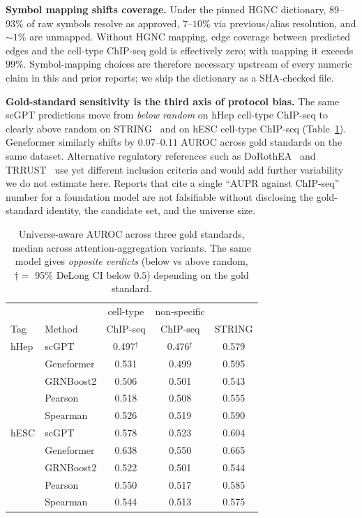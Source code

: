 \documentclass[sigconf, nonacm, anonymous]{acmart}
\begin{document}
\textbf{Symbol mapping shifts coverage.}
Under the pinned HGNC dictionary, $89$--$93\%$ of raw symbols resolve
as approved, $7$--$10\%$ via previous/alias resolution, and $\sim 1\%$
are unmapped. Without HGNC mapping, edge coverage between
predicted edges and the cell-type ChIP-seq gold is effectively zero;
with mapping it exceeds $99\%$. Symbol-mapping choices are therefore
necessary upstream of every numeric claim in this and prior reports;
we ship the dictionary as a SHA-checked file.

\textbf{Gold-standard sensitivity is the third axis of protocol bias.}
The same scGPT predictions move from \emph{below random} on hHep
cell-type ChIP-seq to clearly above random on STRING~\cite{string2019}
and on hESC cell-type ChIP-seq (Table~\ref{tab:gs_sens}). Geneformer
similarly shifts by $0.07$--$0.11$ AUROC across gold standards on the
same dataset. Alternative regulatory references such as
DoRothEA~\cite{garcia2019dorothea} and TRRUST~\cite{han2018trrust} use
yet different inclusion criteria and would add further variability we
do not estimate here. Reports that cite a single ``AUPR against
ChIP-seq'' number for a foundation model are not falsifiable without
disclosing the gold-standard identity, the candidate set, and the
universe size.

\begin{table}[t]
\caption{Universe-aware AUROC across three gold standards, median
across attention-aggregation variants. The same model gives
\emph{opposite verdicts} (below vs above random, $\dagger = $ 95\%
DeLong CI below $0.5$) depending on the gold standard.}
\label{tab:gs_sens}
\footnotesize
\setlength{\tabcolsep}{4pt}
\begin{tabular}{llccc}
\toprule
& & cell-type & non-specific & \\
Tag & Method & ChIP-seq & ChIP-seq & STRING \\
\midrule
hHep & scGPT       & 0.497$^\dagger$ & 0.476$^\dagger$ & 0.579 \\
     & Geneformer  & 0.531           & 0.499           & 0.595 \\
     & GRNBoost2   & 0.506           & 0.501           & 0.543 \\
     & Pearson     & 0.518           & 0.508           & 0.555 \\
     & Spearman    & 0.526           & 0.519           & 0.590 \\
\midrule
hESC & scGPT       & 0.578           & 0.523           & 0.604 \\
     & Geneformer  & 0.638           & 0.550           & 0.665 \\
     & GRNBoost2   & 0.522           & 0.501           & 0.544 \\
     & Pearson     & 0.550           & 0.517           & 0.585 \\
     & Spearman    & 0.544           & 0.513           & 0.575 \\
\bottomrule
\end{tabular}
\end{table}
\end{document}
